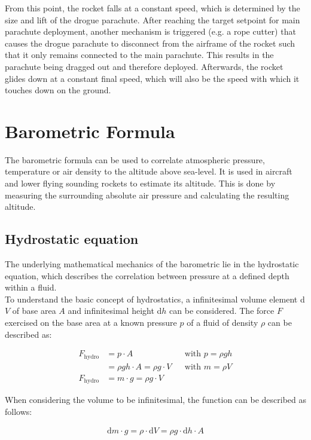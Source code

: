 \documentclass[fontsize=11pt,%
twoside,%
BCOR          = 8mm, %
DIV           = 11,  %
titlepage     = off,%
index=totoc,%
xcolor        = pdftex,%
dvipsnames,%
bibliography  = totoc,%
bibliography = numbered, %
listof        = notnumbered]{scrreprt}
\begin{document}
From this point, the rocket falls at a constant speed, which is determined by the size and lift of the drogue parachute. After reaching the target setpoint for main parachute deployment, another mechanism is triggered (e.g. a rope cutter) that causes the drogue parachute to disconnect from the airframe of the rocket such that it only remains connected to the main parachute. This results in the parachute being dragged out and therefore deployed. Afterwards, the rocket glides down at a constant final speed, which will also be the speed with which it touches down on the ground.

\section{Barometric Formula}
The barometric formula can be used to correlate atmospheric pressure, temperature or air density to the altitude above sea-level. It is used in aircraft and lower flying sounding rockets to estimate its altitude. This is done by measuring the surrounding absolute air pressure and calculating the resulting altitude.\\

\subsection{Hydrostatic equation}
The underlying mathematical mechanics of the barometric lie in the hydrostatic equation, which describes the correlation between pressure at a defined depth within a fluid.\\
To understand the basic concept of hydrostatics, a infinitesimal volume element d$V$ of base area $A$ and infinitesimal height d$h$ can be considered. The force $F$ exercised on the base area at a known pressure $p$ of a fluid of density $\rho$ can be described as:

\begin{align}
	F_\text{hydro} &= p\cdot A && \text{with } p = \rho gh\\
	&= \rho gh\cdot A = \rho g\cdot V && \text{with } m = \rho V \label{eqn:Hydrostatic_force}\\	
	F_\text{hydro} &= m\cdot g = \rho g\cdot V
	\end{align}

When considering the volume to be infinitesimal, the function can be described as follows:

\begin{align}
	\text{d}m\cdot g = \rho\cdot\text{d}V =\rho g\cdot\text{d}h\cdot A	
	\label{eqn:Hydrostatic_pressure}
\end{align}
\end{document}
